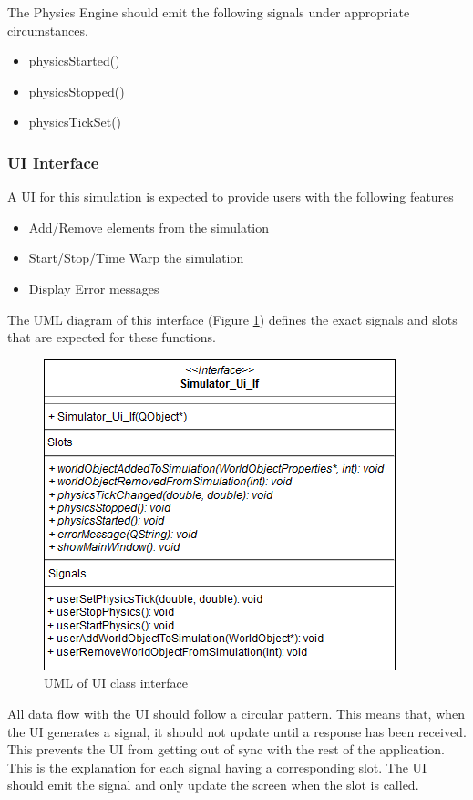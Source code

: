   The Physics Engine should emit the following signals under appropriate circumstances.
  \begin{itemize}
  	\item physicsStarted()
  	\item physicsStopped()
  	\item physicsTickSet()
  \end{itemize}
  
  \subsubsection*{UI Interface}
  A UI for this simulation is expected to provide users with the following features
  \begin{itemize}
  	\item Add/Remove elements from the simulation
  	\item Start/Stop/Time Warp the simulation
  	\item Display Error messages
  \end{itemize}
  
  The UML diagram of this interface (Figure \ref{uml:ui_if}) defines the exact signals and slots that are expected for these functions.
 \begin{figure}[h]
 	\begin{center}
 	\includegraphics[scale=0.5]{./images_design/uml/Ui_If}
 	\caption{UML of UI class interface\label{uml:ui_if}}
 	\end{center}
 \end{figure}
 
 All data flow with the UI should follow a circular pattern. This means that, when the UI generates a signal, it should not update until a response has been received. This prevents the UI from getting out of sync with the rest of the application. This is the explanation for each signal having a corresponding slot. The UI should emit the signal and only update the screen when the slot is called.
 	
